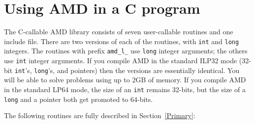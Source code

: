 \documentclass[11pt]{article}
\begin{document}
\section{Using AMD in a C program}
\label{Cversion}

The C-callable AMD library consists of seven user-callable routines and one
include file.  There are two versions of each of the routines, with
{\tt int} and {\tt long} integers.
The routines with prefix
{\tt amd\_l\_} use {\tt long} integer arguments; the others use
{\tt int} integer arguments.  If you compile AMD in the standard
ILP32 mode (32-bit {\tt int}'s, {\tt long}'s, and pointers) then the versions
are essentially identical.  You will be able to solve problems using up to 2GB
of memory.  If you compile AMD in the standard LP64 mode, the size of an
{\tt int} remains 32-bits, but the size of a {\tt long} and a pointer both get
promoted to 64-bits.

The following routines are fully described in Section~\ref{Primary}:
\end{document}
